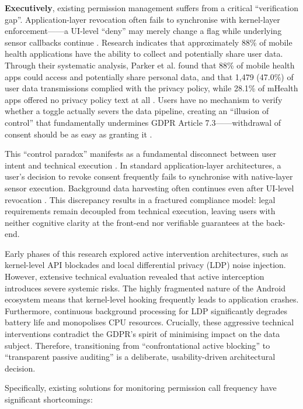 \textbf{Executively}, existing permission management suffers from a critical ``verification gap''. Application-layer revocation often fails to synchronise with kernel-layer enforcement——a UI-level ``deny'' may merely change a flag while underlying sensor callbacks continue \cite{parker2021}. Research indicates that approximately 88\% of mobile health applications have the ability to collect and potentially share user data. Through their systematic analysis, Parker et al. found that 88\% of mobile health apps could access and potentially share personal data, and that 1,479 (47.0\%) of user data transmissions complied with the privacy policy, while 28.1\% of mHealth apps offered no privacy policy text at all \cite{parker2021}. Users have no mechanism to verify whether a toggle actually severs the data pipeline, creating an ``illusion of control'' that fundamentally undermines GDPR Article 7.3——withdrawal of consent should be as easy as granting it \cite{eurlex2016}.

This ``control paradox'' manifests as a fundamental disconnect between user intent and technical execution \cite{parker2021}. In standard application-layer architectures, a user's decision to revoke consent frequently fails to synchronise with native-layer sensor execution. Background data harvesting often continues even after UI-level revocation \cite{parker2021}. This discrepancy results in a fractured compliance model: legal requirements remain decoupled from technical execution, leaving users with neither cognitive clarity at the front-end nor verifiable guarantees at the back-end.

Early phases of this research explored active intervention architectures, such as kernel-level API blockades and local differential privacy (LDP) noise injection. However, extensive technical evaluation revealed that active interception introduces severe systemic risks. The highly fragmented nature of the Android ecosystem means that kernel-level hooking frequently leads to application crashes. Furthermore, continuous background processing for LDP significantly degrades battery life and monopolises CPU resources. Crucially, these aggressive technical interventions contradict the GDPR's spirit of minimising impact on the data subject. Therefore, transitioning from ``confrontational active blocking'' to ``transparent passive auditing'' is a deliberate, usability-driven architectural decision.

Specifically, existing solutions for monitoring permission call frequency have significant shortcomings:

